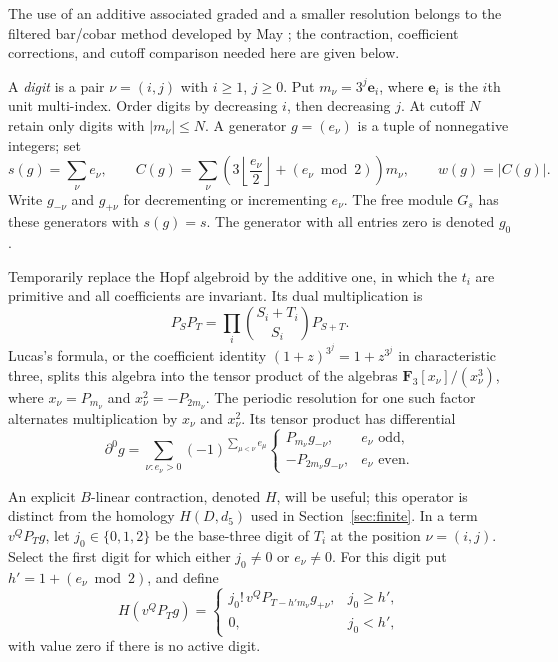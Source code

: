 \documentclass[11pt]{article}
\theoremstyle{definition}
\theoremstyle{remark}
\numberwithin{equation}{section}
\begin{document}
The use of an additive associated graded and a smaller resolution belongs
to the filtered bar/cobar method developed by May
\cite[Sections~4, 6--7]{MayHopfCohomology}; the contraction, coefficient
corrections, and cutoff comparison needed here are given below.

A \emph{digit} is a pair $\nu=(i,j)$ with $i\geq1$, $j\geq0$.
Put $m_\nu=3^j\mathbf e_i$, where $\mathbf e_i$ is the $i$th unit
multi-index.  Order digits by decreasing $i$, then decreasing $j$.
At cutoff $N$ retain only digits with $|m_\nu|\leq N$.
A generator $g=(e_\nu)$ is a tuple of nonnegative integers; set
\begin{equation}\label{alg:generators}
 s(g)=\sum_\nu e_\nu,\qquad
 C(g)=\sum_\nu\left(3\left\lfloor\frac{e_\nu}{2}\right\rfloor
                         +(e_\nu\bmod2)\right)m_\nu,
 \qquad w(g)=|C(g)|.
\end{equation}
Write $g_{-\nu}$ and $g_{+\nu}$ for decrementing or incrementing
$e_\nu$.  The free module $G_s$ has these generators with $s(g)=s$.
The generator with all entries zero is denoted $g_0$.

Temporarily replace the Hopf algebroid by the additive one, in which
the $t_i$ are primitive and all coefficients are invariant.  Its dual
multiplication is
\[
 P_SP_T=\prod_i\binom{S_i+T_i}{S_i}P_{S+T}.
\]
Lucas's formula, or the coefficient identity
$(1+z)^{3^j}=1+z^{3^j}$ in characteristic three, splits this algebra into
the tensor product of the algebras $\mathbf F_3[x_\nu]/(x_\nu^3)$, where
$x_\nu=P_{m_\nu}$ and $x_\nu^2=-P_{2m_\nu}$.  The periodic resolution
for one such factor alternates multiplication by $x_\nu$ and
$x_\nu^2$.  Its tensor product has differential
\begin{equation}\label{alg:additive-differential}
 \partial^0g=\sum_{\nu:e_\nu>0}
 (-1)^{\sum_{\mu<\nu}e_\mu}
 \begin{cases}
 P_{m_\nu}g_{-\nu},& e_\nu\text{ odd},\\
 -P_{2m_\nu}g_{-\nu},& e_\nu\text{ even}.
 \end{cases}
\end{equation}

An explicit $B$-linear contraction, denoted $H$, will be useful;
this operator is distinct from the homology $H(D,d_5)$ used in
Section~\ref{sec:finite}.  In a term
$v^QP_Tg$, let $j_0\in\{0,1,2\}$ be the base-three digit of $T_i$
at the position $\nu=(i,j)$.  Select the first digit for which either
$j_0\ne0$ or $e_\nu\ne0$.  For this digit put
$h'=1+(e_\nu\bmod2)$, and define
\begin{equation}\label{alg:contraction}
 H(v^QP_Tg)=
 \begin{cases}
 j_0!\,v^QP_{T-h'm_\nu}g_{+\nu},&j_0\geq h',\\
 0,&j_0<h',
 \end{cases}
\end{equation}
with value zero if there is no active digit.
\end{document}
